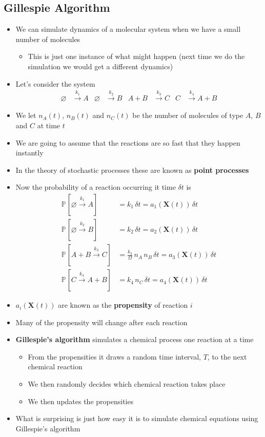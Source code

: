 \documentclass[11pt]{article}
\newcommand{\Prob}[2][]{\mathbb{P}_{#1\!}\left[ #2 \right]}
\newcommand{\goesto}[1]{\stackrel{#1}{\longrightarrow}}
\begin{document}
\subsection{Gillespie Algorithm}
\label{sec:orgb2fb7bc}
\begin{itemize}
\item We can simulate dynamics of a molecular system when we
have a small number of molecules
\begin{itemize}
\item This is just one instance of what might happen (next time we do
the simulation we would get a different dynamics)
\end{itemize}
\item Let's consider the system
\begin{align*}
  \varnothing &\goesto{k_1} A  &
  \varnothing &\goesto{k_2} B & 
   A + B &\goesto{k_3} C &
   C &\goesto{k_4} A + B
\end{align*}
\item We let \(n_A(t)\), \(n_B(t)\) and \(n_C(t)\) be the number of molecules
of type \(A\), \(B\) and \(C\) at time \(t\)
\item We are going to assume that the reactions are so fast that they happen instantly
\item In the theory of stochastic processes these are known as \textbf{point processes}
\item Now the probability of a reaction occurring it time \(\delta t\) is
\begin{align*}
\Prob{\varnothing \goesto{k_1} A} &= k_1\,\delta t  = a_1(\bm{X}(t))\, \delta t\\
\Prob{\varnothing \goesto{k_2} B} &= k_2\,\delta t = a_2(\bm{X}(t))\, \delta t \\
\Prob{A + B \goesto{k_3} C} &= \frac{k_3}{\Omega}\,n_{A}\,n_{B}\,\delta t = a_3(\bm{X}(t))\, \delta t \\
\Prob{C \goesto{k_4} A + B} &= k_4\,n_C\,\delta t  = a_4(\bm{X}(t))\, \delta t
\end{align*}
\item \(a_i(\bm{X}(t))\) are known as the \textbf{propensity} of reaction \(i\)
\item Many of the propensity will change after each reaction
\item \textbf{Gillespie's algorithm} simulates a chemical process one reaction
at a time
\begin{itemize}
\item From the propensities it draws a random time interval, \(T\), to
the next chemical reaction
\item We then randomly decides which chemical reaction takes place
\item We then updates the propensities
\end{itemize}
\item What is surprising is just how easy it is to simulate chemical
equations using Gillespie's algorithm
\end{itemize}
\end{document}
